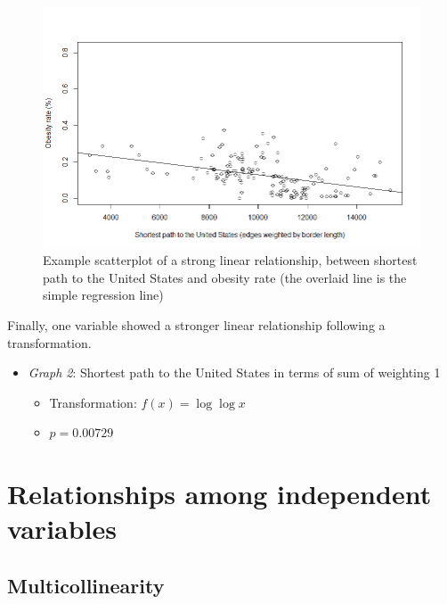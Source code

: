 \documentclass[oneside,12pt]{report}
\begin{document}
\begin{figure}
\centering
\label{fig:shortpath-obesity-scatter}
\includegraphics[width=\textwidth]{borderdegrees_wtd-obrate-scatter.png}
\caption[Scatterplot of a linear relationship with a graph-theoretic variable]{Example scatterplot of a strong linear relationship, between shortest path to the United States and obesity rate (the overlaid line is the simple regression line)}
\end{figure}

\noindent Finally, one variable showed a stronger linear relationship following a transformation.

\begin{itemize}
\item \textit{Graph 2}: Shortest path to the United States in terms of sum of weighting 1
	\begin{itemize}
	\item Transformation: \begin{math}f(x) = \log{\log{x}}\end{math}
	\item \begin{math}p=0.00729\end{math}
	\end{itemize}
\end{itemize}


\section*{Relationships among independent variables}
\subsection*{Multicollinearity}
\end{document}
